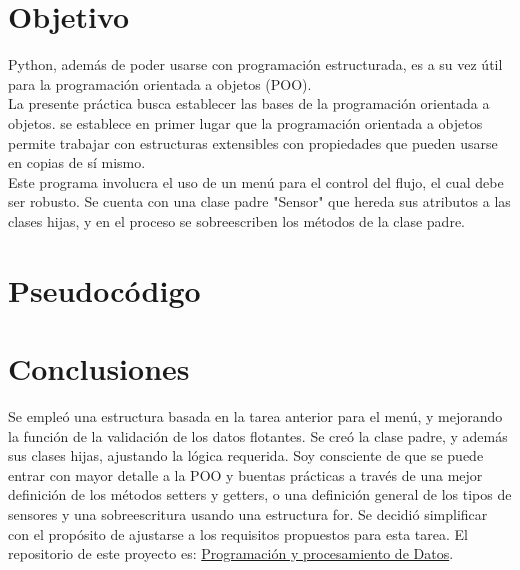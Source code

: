 \documentclass{assignment}
\begin{document}
	
	
	\section*{Objetivo}
	Python, además de poder usarse con programación estructurada, es a su vez útil para la programación orientada a objetos (POO). \\
		La presente práctica busca establecer las bases de la programación orientada a objetos. se establece en primer lugar que la programación orientada a objetos permite trabajar con estructuras extensibles con propiedades que pueden usarse en copias de sí mismo.\\
		Este programa involucra el uso de un menú para el control del flujo, el cual debe ser robusto. Se cuenta con una clase padre "Sensor" que hereda sus atributos a las clases hijas, y en el proceso se sobreescriben los métodos de la clase padre.
	\section*{Pseudocódigo}
	
	\section*{Conclusiones}
	Se empleó una estructura basada en la tarea anterior para el menú, y mejorando la función de la validación de los datos flotantes. Se creó la clase padre, y además sus clases hijas, ajustando la lógica requerida. Soy consciente de que se puede entrar con mayor detalle a la POO y buentas prácticas a través de una mejor definición de los métodos setters y getters, o una definición general de los tipos de sensores y una sobreescritura usando una estructura for. Se decidió simplificar con el propósito de ajustarse a los requisitos propuestos para esta tarea.
	El repositorio de este proyecto es: \href{https://github.com/clivan/Programacion_y_Procesamiento_de_Datos_Infotec/1B}{Programación y procesamiento de Datos}.
	
\end{document}
